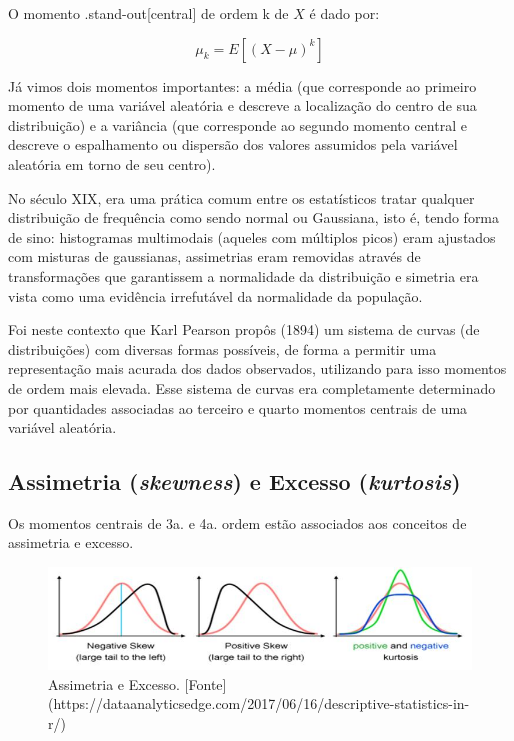 \documentclass[
]{book}
\theoremstyle{definition}
\theoremstyle{definition}
\theoremstyle{definition}
\theoremstyle{remark}
\begin{document}
O momento .stand-out{[}central{]} de ordem k de \(X\) é dado por:

\[{\mu_k^{} = E[(X - \mu)^k]}\]

Já vimos dois momentos importantes: a média (que corresponde ao primeiro momento de uma variável aleatória e descreve a localização do centro de sua distribuição) e a variância (que corresponde ao segundo momento central e descreve o espalhamento ou dispersão dos valores assumidos pela variável aleatória em torno de seu centro).

No século XIX, era uma prática comum entre os estatísticos tratar qualquer distribuição de frequência como sendo normal ou Gaussiana, isto é, tendo forma de sino: histogramas multimodais (aqueles com múltiplos picos) eram ajustados com misturas de gaussianas, assimetrias eram removidas através de transformações que garantissem a normalidade da distribuição e simetria era vista como uma evidência irrefutável da normalidade da população.

Foi neste contexto que Karl Pearson propôs (1894) um sistema de curvas (de distribuições) com diversas formas possíveis, de forma a permitir uma representação mais acurada dos dados observados, utilizando para isso momentos de ordem mais elevada. Esse sistema de curvas era completamente determinado por quantidades associadas ao terceiro e quarto momentos centrais de uma variável aleatória.

\hypertarget{assimetria-skewness-e-excesso-kurtosis}{%
\subsection*{\texorpdfstring{Assimetria (\emph{skewness}) e Excesso (\emph{kurtosis})}{Assimetria (skewness) e Excesso (kurtosis)}}\label{assimetria-skewness-e-excesso-kurtosis}}

Os momentos centrais de 3a. e 4a. ordem estão associados aos conceitos de assimetria e excesso.

\begin{figure}
\includegraphics[width=1\linewidth]{img/skewness-kurtosis} \caption{Assimetria e Excesso. [Fonte](https://dataanalyticsedge.com/2017/06/16/descriptive-statistics-in-r/)}\label{fig:ch5-skewness-kurtosis}
\end{figure}
\end{document}
